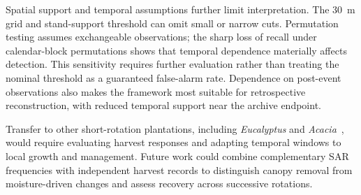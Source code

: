 Spatial support and temporal assumptions further limit interpretation. The 30~m grid and stand-support threshold can omit small or narrow cuts. Permutation testing assumes exchangeable observations; the sharp loss of recall under calendar-block permutations shows that temporal dependence materially affects detection. This sensitivity requires further evaluation rather than treating the nominal threshold as a guaranteed false-alarm rate. Dependence on post-event observations also makes the framework most suitable for retrospective reconstruction, with reduced temporal support near the archive endpoint.

Transfer to other short-rotation plantations, including \textit{Eucalyptus} and \textit{Acacia}~\citep{Spracklen2021Acacia,Huang2026EucalyptusAge}, would require evaluating harvest responses and adapting temporal windows to local growth and management. Future work could combine complementary SAR frequencies with independent harvest records to distinguish canopy removal from moisture-driven changes and assess recovery across successive rotations.